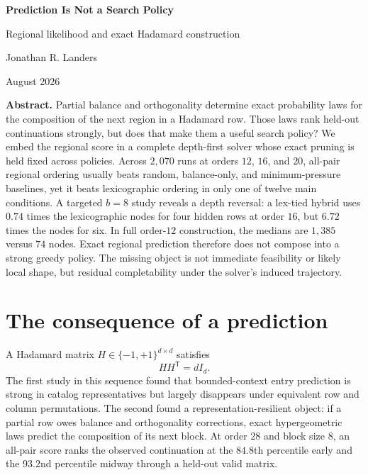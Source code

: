 \documentclass[10pt,twoside]{article}
\theoremstyle{noteplain}
\theoremstyle{definition}
\begin{document}
\begin{center}
  {\fontsize{25}{29}\selectfont\bfseries\color{MidnightBlue}Prediction Is Not a Search Policy}\par\vspace{0.25em}
  {\Large Regional likelihood and exact Hadamard construction}\par\vspace{0.85em}
  {\normalsize Jonathan R. Landers}\par\vspace{0.25em}
  {\small August 2026}
\end{center}

\vspace{0.35em}
\noindent\colorbox{Mist}{%
\begin{minipage}{0.965\linewidth}
\small
\textbf{Abstract.}
Partial balance and orthogonality determine exact probability laws for the composition of the next region in a Hadamard row.  Those laws rank held-out continuations strongly, but does that make them a useful search policy?  We embed the regional score in a complete depth-first solver whose exact pruning is held fixed across policies.  Across $2{,}070$ runs at orders $12$, $16$, and $20$, all-pair regional ordering usually beats random, balance-only, and minimum-pressure baselines, yet it beats lexicographic ordering in only one of twelve main conditions.  A targeted $b=8$ study reveals a depth reversal: a lex-tied hybrid uses $0.74$ times the lexicographic nodes for four hidden rows at order $16$, but $6.72$ times the nodes for six.  In full order-$12$ construction, the medians are $1{,}385$ versus $74$ nodes.  Exact regional prediction therefore does not compose into a strong greedy policy.  The missing object is not immediate feasibility or likely local shape, but residual completability under the solver's induced trajectory.
\end{minipage}}

\section{The consequence of a prediction}

A Hadamard matrix $H\in\{-1,+1\}^{d\times d}$ satisfies
\begin{equation}\label{eq:hadamard}
HH^{\mathsf T}=dI_d.
\end{equation}
The first study in this sequence found that bounded-context entry prediction is strong in catalog representatives but largely disappears under equivalent row and column permutations.  The second found a representation-resilient object: if a partial row owes balance and orthogonality corrections, exact hypergeometric laws predict the composition of its next block.  At order $28$ and block size $8$, an all-pair score ranks the observed continuation at the $84.8$th percentile early and the $93.2$nd percentile midway through a held-out valid matrix.
\end{document}
